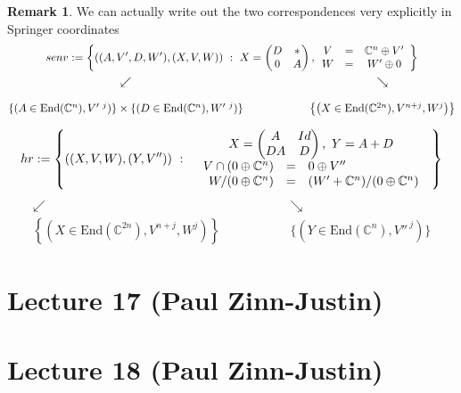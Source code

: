 \documentclass[12pt]{amsart}
\numberwithin{equation}{section}
\theoremstyle{definition}
\newtheorem{Remark}[equation]{Remark}
\numberwithin{figure}{section}
\newcommand{\C}{\mathbb{C}}
\begin{document}
\begin{Remark}
We can actually write out the two correspondences very explicitly in Springer coordinates
\begin{gather*}
senv := \left\{ \left(
    (A,V',D,W'),
    \left(X,V,W\right)\right)
  \ :\
  X = \begin{pmatrix} D & * \\ 0 & A \end{pmatrix}, 
  \begin{array}[c]{ccc} V &=& \C^n \oplus V'\\
    W &=& W'\oplus 0  \end{array}
  \right\} 
\\
\begin{matrix}
  \swarrow &&\searrow \\ \\
  \{(A \in \mathrm{End}(\C^n), V'^{\ j})\} \times  \{(D \in \mathrm{End}(\C^n), W'^{\ j})\}
  &\qquad\qquad&
  \left\{ \left(X \in  \mathrm{End}(\C^{2n}), V^{n+j}, W^j \right) \right\}
\end{matrix}
\end{gather*}

$$ 
hr := \left\{ \left((X,V,W),(Y,V'') \right)  \ :\ 
  \begin{array}[c]{c}
    X = \begin{pmatrix} A & Id \\ DA & D \end{pmatrix}, \   Y = A+D\\
    \begin{array}{rcl}
      V \cap (0\oplus \C^n) &=& 0 \oplus V'' \\
      W / (0\oplus \C^n) &=& (W' + \C^n)/(0\oplus \C^n)
    \end{array}
  \end{array}
\right\}   
$$
$$
\begin{matrix}
  \swarrow &&\searrow \\
  \left\{ \left(X \in  \mathrm{End}(\C^{2n}), V^{n+j}, W^j \right) \right\}
  &\qquad\qquad&
  \{(Y \in  \mathrm{End}(\C^n), V''^{\ j})\} 
\end{matrix}
$$

\end{Remark}

\section{Lecture 17 (Paul Zinn-Justin)}

\section{Lecture 18 (Paul Zinn-Justin)}
\end{document}
